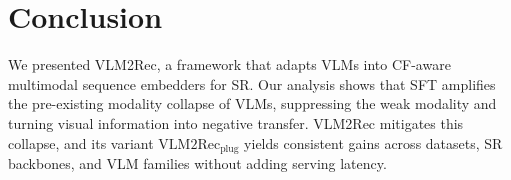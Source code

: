 \section{Conclusion}
\label{sec:conclusion}
We presented VLM2Rec, a framework that adapts VLMs into CF-aware multimodal sequence embedders for SR.
Our analysis shows that SFT amplifies the pre-existing modality collapse of VLMs, suppressing the weak modality and turning visual information into negative transfer.
VLM2Rec mitigates this collapse, and its variant $\text{VLM2Rec}_{\text{plug}}$ yields consistent gains across datasets, SR backbones, and VLM families without adding serving latency.

